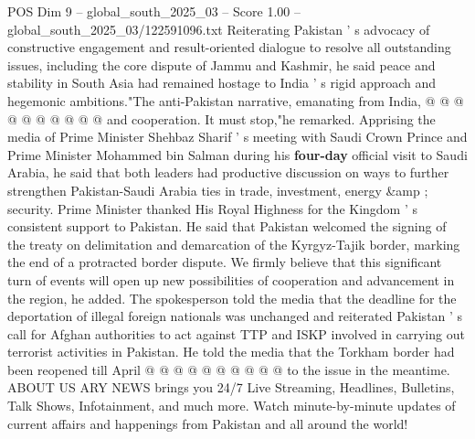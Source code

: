 \begin{textsample}{POS Dim 9 – global\_south\_2025\_03 – Score 1.00 – global\_south\_2025\_03/122591096.txt}
Reiterating Pakistan ' s advocacy of constructive engagement and result-oriented dialogue to resolve all outstanding issues, including the core dispute of Jammu and Kashmir, he said peace and stability in South Asia had remained hostage to India ' s rigid approach and hegemonic ambitions."The anti-Pakistan narrative, emanating from India, @ @ @ @ @ @ @ @ @ @ and cooperation.
It must stop,"he remarked.
Apprising the media of Prime Minister Shehbaz Sharif ' s meeting with Saudi Crown Prince and Prime Minister Mohammed bin Salman during his \textbf{four-day} official visit to Saudi Arabia, he said that both leaders had productive discussion on ways to further strengthen Pakistan-Saudi Arabia ties in trade, investment, energy \&amp ; security.
Prime Minister thanked His Royal Highness for the Kingdom ' s consistent support to Pakistan.
He said that Pakistan welcomed the signing of the treaty on delimitation and demarcation of the Kyrgyz-Tajik border, marking the end of a protracted border dispute.
We firmly believe that this significant turn of events will open up new possibilities of cooperation and advancement in the region, he added.
The spokesperson told the media that the deadline for the deportation of illegal foreign nationals was unchanged and reiterated Pakistan ' s call for Afghan authorities to act against TTP and ISKP involved in carrying out terrorist activities in Pakistan.
He told the media that the Torkham border had been reopened till April @ @ @ @ @ @ @ @ @ @ to the issue in the meantime.
ABOUT US ARY NEWS brings you 24/7 Live Streaming, Headlines, Bulletins, Talk Shows, Infotainment, and much more.
Watch minute-by-minute updates of current affairs and happenings from Pakistan and all around the world!

\end{textsample}
